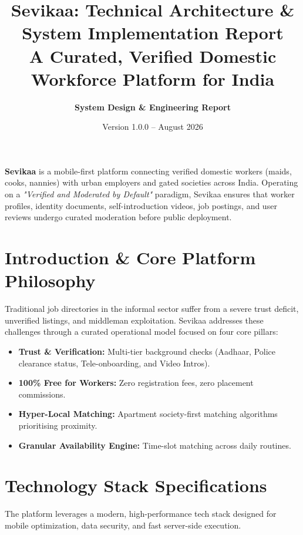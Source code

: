 \documentclass[11pt,a4paper]{article}
\title{\textbf{\huge Sevikaa: Technical Architecture \& System Implementation Report}\\[0.5em]
\large A Curated, Verified Domestic Workforce Platform for India}
\author{\textbf{System Design \& Engineering Report}}
\date{Version 1.0.0 -- August 2026}
\begin{document}
\maketitle

\begin{tcolorbox}[colback=blue!5white,colframe=primaryblue,title=\textbf{Executive Summary}]
\textbf{Sevikaa} is a mobile-first platform connecting verified domestic workers (maids, cooks, nannies) with urban employers and gated societies across India. Operating on a \textit{"Verified and Moderated by Default"} paradigm, Sevikaa ensures that worker profiles, identity documents, self-introduction videos, job postings, and user reviews undergo curated moderation before public deployment.
\end{tcolorbox}

\section{Introduction \& Core Platform Philosophy}
Traditional job directories in the informal sector suffer from a severe trust deficit, unverified listings, and middleman exploitation. Sevikaa addresses these challenges through a curated operational model focused on four core pillars:
\begin{itemize}[noitemsep]
    \item \textbf{Trust \& Verification:} Multi-tier background checks (Aadhaar, Police clearance status, Tele-onboarding, and Video Intros).
    \item \textbf{100\% Free for Workers:} Zero registration fees, zero placement commissions.
    \item \textbf{Hyper-Local Matching:} Apartment society-first matching algorithms prioritising proximity.
    \item \textbf{Granular Availability Engine:} Time-slot matching across daily routines.
\end{itemize}

\section{Technology Stack Specifications}
The platform leverages a modern, high-performance tech stack designed for mobile optimization, data security, and fast server-side execution.
\end{document}
